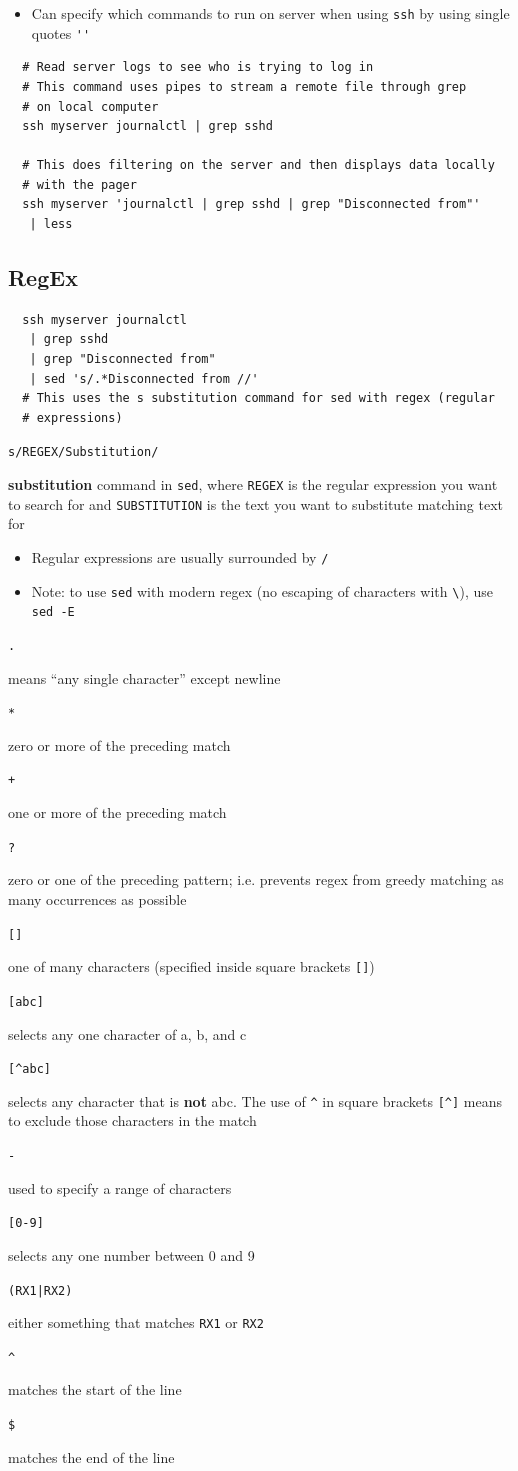 \documentclass[letterpaper,12pt]{article}
\newcommand*{\lstitem}[1]{
  \setbox0\hbox{\lstinline{#1}}
  \item[\usebox0]
}
\begin{document}
\begin{itemize}
 \item Can specify which commands to run on server when using \lstinline{ssh} by using single quotes \lstinline{''}
\end{itemize}

\begin{lstlisting}
  # Read server logs to see who is trying to log in
  # This command uses pipes to stream a remote file through grep
  # on local computer
  ssh myserver journalctl | grep sshd

  # This does filtering on the server and then displays data locally
  # with the pager
  ssh myserver 'journalctl | grep sshd | grep "Disconnected from"'
   | less
\end{lstlisting}

\subsection{RegEx}

\begin{lstlisting}
  ssh myserver journalctl
   | grep sshd
   | grep "Disconnected from"
   | sed 's/.*Disconnected from //'
  # This uses the s substitution command for sed with regex (regular
  # expressions)
\end{lstlisting}

\begin{description}
 \lstitem{s/REGEX/Substitution/} \textbf{substitution} command in \lstinline{sed}, where \lstinline{REGEX} is the regular expression you want to search for and \lstinline{SUBSTITUTION} is the text you want to substitute matching text for
\end{description}

\begin{itemize}
 \item Regular expressions are usually surrounded by \lstinline{/}
 \item Note: to use \lstinline{sed} with modern regex (no escaping of characters with \lstinline{\}), use \lstinline{sed -E}
\end{itemize}

\begin{description}
 \lstitem{.} means “any single character” except newline
 \lstitem{*} zero or more of the preceding match
 \lstitem{+} one or more of the preceding match
 \lstitem{?} zero or one of the preceding pattern; i.e. prevents regex from greedy matching as many occurrences as possible
 \lstitem{[]} one of many characters (specified inside square brackets \lstinline{[]})
 \lstitem{[abc]} selects any one character of a, b, and c
 \lstitem{[^abc]} selects any character that is \textbf{not} abc. The use of \lstinline{^} in square brackets \lstinline{[^]} means to exclude those characters in the match
 \lstitem{-} used to specify a range of characters
 \lstitem{[0-9]} selects any one number between 0 and 9
 \lstitem{(RX1|RX2)} either something that matches \lstinline{RX1} or \lstinline{RX2}
 \lstitem{^} matches the start of the line
 \lstitem{$} matches the end of the line
\end{description}
\end{document}
